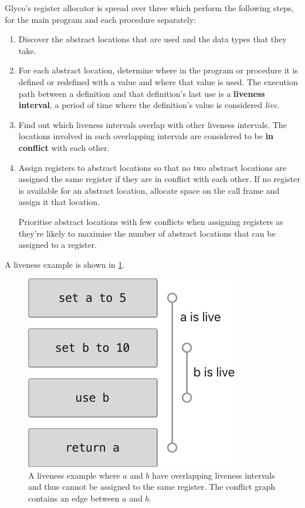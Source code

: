 \documentclass[main.tex]{subfiles}
\begin{document}
Glyco's register allocator is spread over three  which perform the following steps, for the main program and each procedure separately:
\begin{enumerate}
	\item Discover the abstract locations that are used and the data types that they take.
	\item For each abstract location, determine where in the program or procedure it is defined or redefined with a value and where that value is used. The execution path between a definition and that definition's last use is a \textbf{liveness interval}, a period of time where the definition's value is considered \emph{live}.
	\item Find out which liveness intervals overlap with other liveness intervals. The locations involved in such overlapping intervals are considered to be \textbf{in conflict} with each other.
	\item Assign registers to abstract locations so that no two abstract locations are assigned the same register if they are in conflict with each other. If no register is available for an abstract location, allocate space on the call frame and assign it that location.
	
	Prioritise abstract locations with few conflicts when assigning registers as they're likely to maximise the number of abstract locations that can be assigned to a register.
\end{enumerate}

A liveness example is shown in \cref{fig:liveness}.

\begin{figure}
	\centering
	\includegraphics{Images/Liveness.pdf}
	\caption{A liveness example where $a$ and $b$ have overlapping liveness intervals and thus cannot be assigned to the same register. The conflict graph contains an edge between $a$ and $b$.}
	\label{fig:liveness}
\end{figure}
\end{document}
